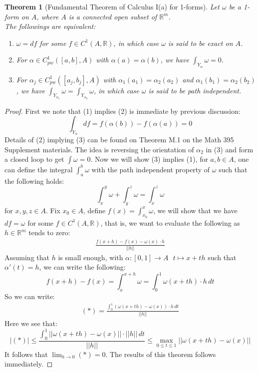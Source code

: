 \documentclass[15pt]{book}
\theoremstyle{break}
\theoremstyle{break}
\newtheorem{thm}{Theorem}[section]
\newcommand{\R}{\mathbb{R}}
\begin{document}
\begin{thm}[Fundamental Theorem of Calculus I(a) for 1-forms]
Let $\omega$ be a 1-form on $A$, where $A$ is a connected open subset of $\R^m$. \\
The followings are equivalent:
\begin{enumerate}[topsep=3pt,itemsep=-1ex,partopsep=1ex,parsep=1ex]
\item $\omega = df$ for some $f \in C^1(A,\R)$, in which case $\omega$ is said to be exact on $A$.
\item For $\alpha \in C_{pw}^1 ([a,b],A)$ with $\alpha(a) = \alpha(b)$, we have $\int_{Y_\alpha} \omega = 0$.
\item For $\alpha_j \in C_{pw}^1 ([a_j,b_j],A)$ with $\alpha_1(a_1) = \alpha_2(a_2)$ and $\alpha_1(b_1) = \alpha_2(b_2)$, we have $\int_{Y_{\alpha_1}}\omega = \int_{Y_{\alpha_2}} \omega $, in which case $\omega$ is said to be path independent. 
\end{enumerate}
\end{thm}
\begin{proof}
First we note that (1) implies (2) is immediate by previous discussion: 
$$\int_{Y_\alpha} df = f(\alpha(b))-f(\alpha(a)) = 0$$
Details of (2) implying (3) can be found on Theorem M.1 on the Math 395 Supplement materials. The idea is reversing the orientation of $\alpha_2$ in (3) and form a closed loop to get $\int \omega = 0$. Now we will show (3) implies (1), for $a,b \in A$, one can define the integral $\int_a^b \omega$ with the path independent property of $\omega$ such that the following holds:
$$\int_x^y \omega + \int_y^z \omega = \int_x^z \omega$$
for $x,y,z \in A$. Fix $x_0 \in A$, define $f(x) = \int_{x_0}^ x \omega$, we will show that we have $df = \omega$ for some $f \in C^1(A,\R)$, that is, we want to evaluate the following as $h\in \R^m$ tends to zero:
\begin{align*}
\frac{f(x+h)-f(x) -\omega(x)\cdot h}{||h||} \tag{*}
\end{align*}
Assuming that $h$ is small enough, with $\alpha:[0,1]\to A\ \ \ t\mapsto x+th$ such that $\alpha'(t) = h$, we can write the following:
$$f(x+h)-f(x) = \int_x^{x+h}\omega = \int_0^1 \omega (x+th) \cdot h\, dt $$
So we can write:
\begin{align*}
(*) = \frac{\int_0^1 \left(\omega(x+th) - \omega(x)\right)\cdot h \, dt}{||h||}
\end{align*}
Here we see that:
$$|(*)|\leq \frac{\int_0^1||\omega(x+th)-\omega(x)||\cdot ||h||\, dt}{||h||} \leq \max_{0\leq t\leq 1} ||\omega(x+th)-\omega(x)||$$
It follows that $\lim_{h\to 0}(*) = 0$. The results of this theorem follows immediately.
\end{proof}
\end{document}
